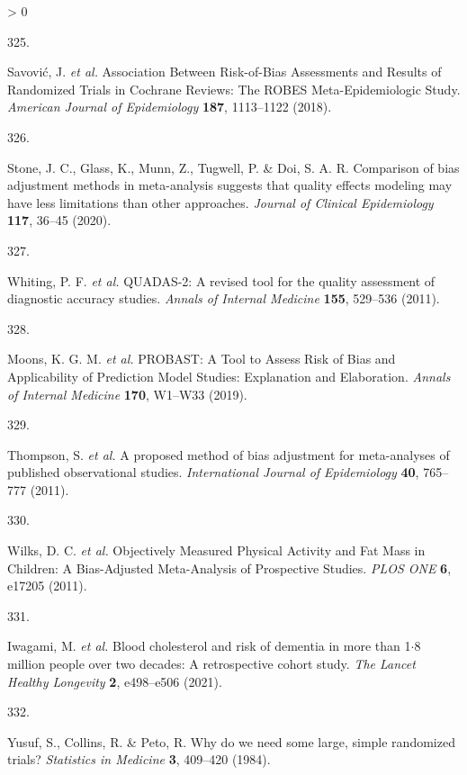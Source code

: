 \documentclass[a4paper, twoside]{templates/ociamthesis}
\newlength{\cslhangindent}
\newlength{\csllabelwidth}
\newenvironment{CSLReferences}[3] %
 {%
  \setlength{\parindent}{0pt}
  \ifodd #1 \everypar{\setlength{\hangindent}{\cslhangindent}}\ignorespaces\fi
  \ifnum #2 > 0
  \setlength{\parskip}{#2\baselineskip}
  \fi
 }%
 {}
\newcommand{\CSLLeftMargin}[1]{\parbox[t]{\maxof{\widthof{#1}}{\csllabelwidth}}{#1}}
\newcommand{\CSLRightInline}[1]{\parbox[t]{\linewidth - \csllabelwidth}{#1}}
\begin{document}
\begin{CSLReferences}{0}{0}
\leavevmode\hypertarget{ref-savovic2018}{}%
\CSLLeftMargin{325. }
\CSLRightInline{Savović, J. \emph{et al.} Association {Between Risk}-of-{Bias Assessments} and {Results} of {Randomized Trials} in {Cochrane Reviews}: The {ROBES Meta}-{Epidemiologic Study}. \emph{American Journal of Epidemiology} \textbf{187}, 1113--1122 (2018).}

\leavevmode\hypertarget{ref-stone2020}{}%
\CSLLeftMargin{326. }
\CSLRightInline{Stone, J. C., Glass, K., Munn, Z., Tugwell, P. \& Doi, S. A. R. Comparison of bias adjustment methods in meta-analysis suggests that quality effects modeling may have less limitations than other approaches. \emph{Journal of Clinical Epidemiology} \textbf{117}, 36--45 (2020).}

\leavevmode\hypertarget{ref-whiting2011a}{}%
\CSLLeftMargin{327. }
\CSLRightInline{Whiting, P. F. \emph{et al.} {QUADAS}-2: A revised tool for the quality assessment of diagnostic accuracy studies. \emph{Annals of Internal Medicine} \textbf{155}, 529--536 (2011).}

\leavevmode\hypertarget{ref-moons2019}{}%
\CSLLeftMargin{328. }
\CSLRightInline{Moons, K. G. M. \emph{et al.} {PROBAST}: A {Tool} to {Assess Risk} of {Bias} and {Applicability} of {Prediction Model Studies}: Explanation and {Elaboration}. \emph{Annals of Internal Medicine} \textbf{170}, W1--W33 (2019).}

\leavevmode\hypertarget{ref-thompson2011}{}%
\CSLLeftMargin{329. }
\CSLRightInline{Thompson, S. \emph{et al.} A proposed method of bias adjustment for meta-analyses of published observational studies. \emph{International Journal of Epidemiology} \textbf{40}, 765--777 (2011).}

\leavevmode\hypertarget{ref-wilks2011}{}%
\CSLLeftMargin{330. }
\CSLRightInline{Wilks, D. C. \emph{et al.} Objectively {Measured Physical Activity} and {Fat Mass} in {Children}: A {Bias}-{Adjusted Meta}-{Analysis} of {Prospective Studies}. \emph{PLOS ONE} \textbf{6}, e17205 (2011).}

\leavevmode\hypertarget{ref-iwagami2021}{}%
\CSLLeftMargin{331. }
\CSLRightInline{Iwagami, M. \emph{et al.} Blood cholesterol and risk of dementia in more than 1{\(\cdot\)}8 million people over two decades: A retrospective cohort study. \emph{The Lancet Healthy Longevity} \textbf{2}, e498--e506 (2021).}

\leavevmode\hypertarget{ref-yusuf1984}{}%
\CSLLeftMargin{332. }
\CSLRightInline{Yusuf, S., Collins, R. \& Peto, R. Why do we need some large, simple randomized trials? \emph{Statistics in Medicine} \textbf{3}, 409--420 (1984).}


\end{CSLReferences}
\end{document}

